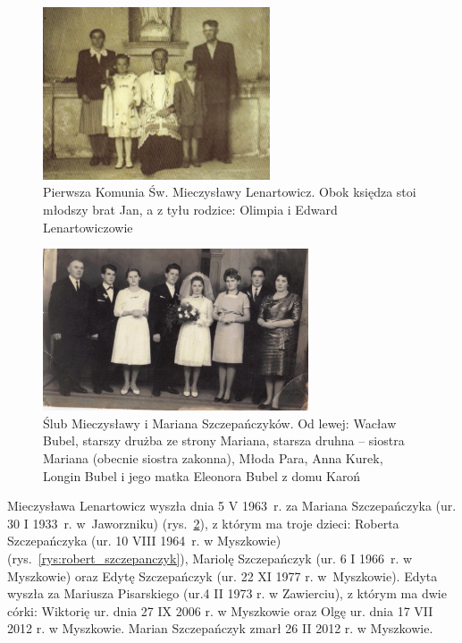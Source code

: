 \begin{figure}[!h]
\begin{center}
\includegraphics[width=0.6\textwidth]{zdjecia/olimpia_edward_lenartowicz_z_dziecmi.jpg}
\caption[Pierwsza Komunia św. Mieczysławy Lenartowicz, zdjęcie z bratem Janem i rodzicami: Olimpią i Edwardem.]{Pierwsza Komunia Św. Mieczysławy Lenartowicz. Obok księdza stoi młodszy brat Jan, a z tyłu rodzice: Olimpia i Edward Lenartowiczowie}
\label{rys:olimpia_edward_lenartowicz_z_dziecmi.jpg}
\end{center}
\end{figure}

\begin{figure}[!b]
\begin{center}
\includegraphics[width=0.7\textwidth]{zdjecia/slub_mieczyslawy_i_mariana_szczepanczykow.jpg}
\caption[Ślub Mieczysławy i Mariana Szczepańczyków]{Ślub Mieczysławy i Mariana Szczepańczyków. Od lewej: Wacław Bubel, starszy drużba ze strony Mariana, starsza druhna -- siostra Mariana (obecnie siostra zakonna), Młoda Para, Anna Kurek, Longin Bubel i jego matka Eleonora Bubel z domu Karoń}
\label{rys:slub_mieczyslawy_i_mariana_szczepanczykow}
\end{center}
\end{figure}

Mieczysława Lenartowicz wyszła dnia 5 V 1963~r. za Mariana Szczepańczyka (ur. 30 I 1933~r. w~Jaworzniku) (rys.~\ref{rys:slub_mieczyslawy_i_mariana_szczepanczykow}), z którym ma troje dzieci: Roberta Szczepańczyka (ur. 10 VIII 1964~r. w Myszkowie) (rys.~\ref{rys:robert_szczepanczyk}), Mariolę Szczepańczyk (ur. 6 I 1966~r. w Myszkowie) oraz Edytę Szczepańczyk (ur. 22 XI 1977 r. w~Myszkowie). Edyta wyszła za Mariusza Pisarskiego (ur.4 II 1973 r. w Zawierciu), z którym ma dwie córki: Wiktorię ur. dnia 27 IX 2006 r. w Myszkowie oraz Olgę ur. dnia 17 VII 2012 r. w Myszkowie. Marian Szczepańczyk zmarł 26 II 2012 r. w Myszkowie.

